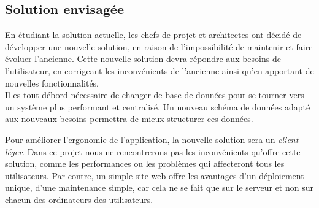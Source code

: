 \subsection{Solution envisagée}

En étudiant la solution actuelle, les chefs de projet et architectes ont décidé de développer une nouvelle solution, en raison de l'impossibilité de maintenir et faire évoluer l'ancienne.
Cette nouvelle solution devra répondre aux besoins de l'utilisateur, en corrigeant les inconvénients de l'ancienne ainsi qu'en apportant de nouvelles fonctionnalités.
\\

Il es tout débord nécessaire de changer de base de données pour se tourner vers un système plus performant et centralisé.
Un nouveau schéma de données adapté aux nouveaux besoins permettra de mieux structurer ces données.

Pour améliorer l'ergonomie de l'application, la nouvelle solution sera un \textit{client léger}.
Dans ce projet nous ne rencontrerons pas les inconvénients qu'offre cette solution, comme les performances ou les problèmes qui affecteront tous les utilisateurs.
Par contre, un simple site web offre les avantages d'un déploiement unique, d'une maintenance simple, car cela ne se fait que sur le serveur et non sur chacun des ordinateurs des utilisateurs.